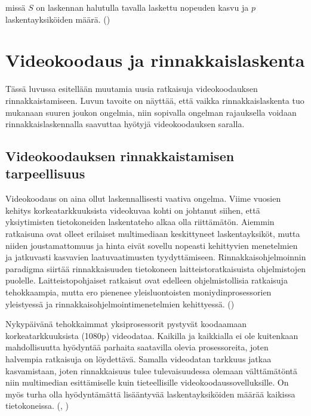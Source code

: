 missä $S$ on laskennan halutulla tavalla laskettu nopeuden kasvu ja $p$
laskentayksiköiden määrä. (\citealt{intro})

\section{Videokoodaus ja rinnakkaislaskenta}
\label{chap:parallel_coding}

Tässä luvussa esitellään muutamia uusia ratkaisuja videokoodauksen
rinnakkaistamiseen. Luvun tavoite on näyttää, että vaikka rinnakkaislaskenta
tuo mukanaan suuren joukon ongelmia, niin sopivalla ongelman rajauksella
voidaan rinnakkaislaskennalla saavuttaa hyötyjä videokoodauksen saralla.

\subsection{Videokoodauksen rinnakkaistamisen tarpeellisuus}

Videokoodaus on aina ollut laskennallisesti vaativa ongelma. Viime vuosien
kehitys korkeatarkkuuksista videokuvaa kohti on johtanut siihen, että
yksiytimisten tietokoneiden laskentateho alkaa olla riittämätön.
Aiemmin ratkaisuna ovat olleet erilaiset multimediaan keskittyneet
laskentayksiköt, mutta niiden joustamattomuus ja hinta eivät sovellu nopeasti
kehittyvien menetelmien ja jatkuvasti kasvavien laatuvaatimusten tyydyttämiseen.
Rinnakkaisohjelmoinnin paradigma siirtää rinnakkaisuuden tietokoneen
laitteistoratkaisuista ohjelmistojen puolelle. Laitteistopohjaiset ratkaisut
ovat edelleen ohjelmistollisia ratkaisuja tehokkaampia, mutta ero pienenee
yleisluontoisten moniydinprosessorien yleistyessä ja
rinnakkaisohjelmointimenetelmien kehittyessä. (\citealt{choi})

Nykypäivänä tehokkaimmat yksiprosessorit pystyvät koodaamaan
korkeatarkkuuksista (1080p) videodataa. Kaikilla ja kaikkialla ei ole
kuitenkaan mahdollisuutta hyödyntää parhaita saatavilla olevia prosessoreita,
joten halvempia ratkaisuja on löydettävä. Samalla videodatan tarkkuus jatkaa
kasvamistaan, joten rinnakkaisuus tulee tulevaisuudessa olemaan välttämätöntä
niin multimedian esittämiselle kuin tieteellisille videokoodaussovelluksille.
On myös turha olla hyödyntämättä lisääntyvää laskentayksiköiden määrää kaikissa
tietokoneissa. (\citealt{chi}, \citealt{xu})

